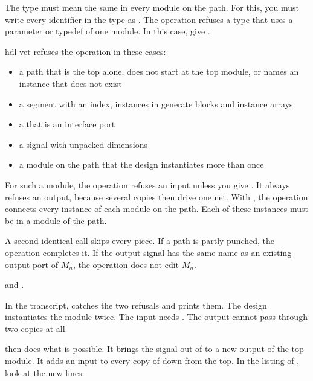 \begin{entry}{}
  The type must mean the same in every module on the path. For this, you must write
  every identifier in the type as . The operation refuses a type that
  uses a parameter or typedef of one module. In this case, give .
\item[Refused] hdl-vet refuses the operation in these cases:
  \begin{itemize}
  \item a path that is the top alone, does not start at the top module, or names an
    instance that does not exist
  \item a segment with an index, instances in generate blocks and instance arrays
  \item a  that is an interface port
  \item a signal with unpacked dimensions
  \item a module on the path that the design instantiates more than once
  \end{itemize}
  For such a module, the operation refuses an input unless you give
  . It always refuses an output, because several copies then
  drive one net. With , the operation connects every instance of
  each module on the path. Each of these instances must be in a module of the path.
\item[Again] A second identical call skips every piece. If a path is partly
  punched, the operation completes it. If the output signal has the same name as an
  existing output port of $M_n$, the operation does not edit $M_n$.
\item[Example]  and .
\end{entry}







In the transcript,  catches the two refusals and prints
them. The design instantiates the module  twice. The input needs
. The output cannot pass through two copies at all.

 then does what is possible. It brings the signal
 out of  to a new output of the top module. It
adds an input to every copy of  down from the top. In the listing of
, look at the new lines:

